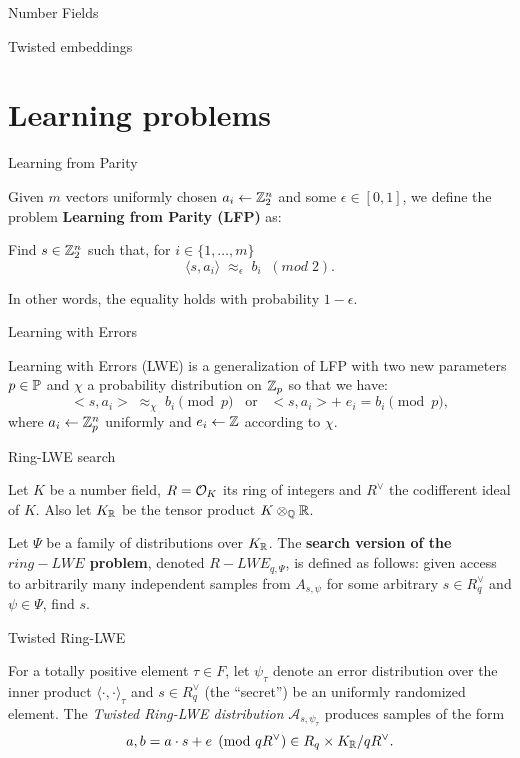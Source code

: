 \documentclass[notheorems, bigger]{beamer}
\begin{document}
\begin{frame}[label={sec:orgfdd8727}]{Number Fields}
\end{frame}
\begin{frame}[label={sec:orgbfac81f}]{Twisted embeddings}
\end{frame}
\section{Learning problems}
\label{sec:org8c8f00d}
\begin{frame}[label={sec:org66f7add}]{Learning from Parity}
\begin{text}
  Given $m$ vectors uniformly chosen  $a_i \gets \Z^n_2$ and some $\epsilon \in [0,1]$, we
  define the problem \textbf{Learning from Parity (LFP)} as:

  Find $s \in \Z^n_2$ such that, for $i \in \{1,\dots,m\}$
  $$ \langle{s, a_i}\rangle \; \approx_\epsilon \; b_i \;\; (mod\; 2). $$

  In other words, the equality holds with probability $1 - \epsilon$.
\end{text}
\end{frame}
\begin{frame}[label={sec:org022b019}]{Learning with Errors}
\begin{text}
Learning with Errors (LWE) is a generalization of LFP  with two new parameters
$p \in \P$ and $\chi$ a probability distribution on $\Z_p$ so that we have:
\[
  <s, a_i> \; \approx_\chi \; b_i \pmod p \;\;\; \text{or} \;\;\; <s, a_i> + \; e_i =  b_i \pmod p ,
\]
where $a_i \gets \Z^n_p$ uniformly and $e_i \gets \Z$ according to $\chi$.
\end{text}
\end{frame}
\begin{frame}[label={sec:orgd929b35}]{Ring-LWE search}
\begin{text}
  Let $K$ be a number field, $R = \Ok$ its ring of integers and $R^\vee$ the
  codifferent ideal of $K$. Also let $K_\R$ be the tensor product $K \otimes_\Q \R$.


  Let $\Psi$ be a family of distributions over $K_\R$. The \textbf{search version of the $ring-LWE$ problem}, denoted $R-LWE_{q,\Psi}$, is defined as follows: given access to arbitrarily many independent samples from $A_{s,\psi}$ for some arbitrary $s \in R_q^\vee$ and $\psi \in \Psi$, find $s$.
\end{text}
\end{frame}
\begin{frame}[label={sec:org909a55f}]{Twisted Ring-LWE}
\begin{text}
  For a totally positive element $\tau \in F$, let $\psi_\tau$ denote an error distribution
  over the inner product $\langle{\cdot,\cdot}\rangle_\tau$ and $s \in R^\vee_q$ (the “secret”) be an
  uniformly randomized element. The \emph{Twisted Ring-LWE distribution}
  $\mathcal{A}_{s,\psi_\tau}$ produces samples of the form
  \[
    a, b = a \cdot s + e \pmod{qR^\vee} \in R_q \times K_\R/qR^\vee.
\]
\end{text}
\end{frame}
\end{document}
